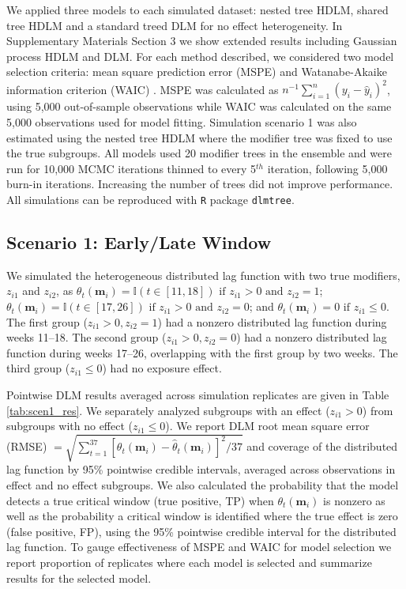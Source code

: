 \documentclass[12pt]{article}
\begin{document}
We applied three models to each simulated dataset: nested tree HDLM, shared tree HDLM and a standard treed DLM for no effect heterogeneity. In Supplementary Materials Section 3 we show extended results including Gaussian process HDLM and DLM. For each method described, we considered two model selection criteria: mean square prediction error (MSPE) and Watanabe-Akaike information criterion (WAIC) \citep{Watanabe2010AsymptoticTheory}. MSPE was calculated as $n^{-1}\sum_{i=1}^n(y_i-\hat{y}_i)^2$, using 5,000 out-of-sample observations while WAIC was calculated on the same 5,000 observations used for model fitting. Simulation scenario 1 was also estimated using the nested tree HDLM where the modifier tree was fixed to use the true subgroups. All models used 20 modifier trees in the ensemble and were run for 10,000 MCMC iterations thinned to every 5$^{th}$ iteration, following 5,000 burn-in iterations. Increasing the number of trees did not improve performance. All simulations can be reproduced with \texttt{R} package \texttt{dlmtree}.

\subsection{Scenario 1: Early/Late Window}

We simulated the heterogeneous distributed lag function with two true modifiers,  $z_{i1}$ and $z_{i2}$, as $\theta_t(\mathbf{m}_i)= \mathbb{I}(t\in[11,18])\text{ if }z_{i1}>0\text{ and }z_{i2}=1$; $\theta_t(\mathbf{m}_i)= \mathbb{I}(t\in[17,26])\text{ if }z_{i1}>0\text{ and }z_{i2}= 0$; and $\theta_t(\mathbf{m}_i)= 0\text{ if } z_{i1}\leq 0$.
The first group ($z_{i1}>0, z_{i2}=1$) had a nonzero distributed lag function during weeks 11--18. The second group ($z_{i1}>0, z_{i2}=0$) had a nonzero distributed lag function during weeks 17--26, overlapping with the first group by two weeks. The third group ($z_{i1}\leq 0$) had no exposure effect.

Pointwise DLM results averaged across simulation replicates are given in Table \ref{tab:scen1_res}. We separately analyzed subgroups with an effect ($z_{i1}>0$) from subgroups with no effect ($z_{i1}\leq0$). We report DLM root mean square error (RMSE) $=\sqrt{\sum_{t=1}^{37}[\theta_t(\mathbf{m}_i)-\hat{\theta}_t(\mathbf{m}_i)]^2/37}$ and coverage of the distributed lag function by 95\% pointwise credible intervals, averaged across observations in effect and no effect subgroups. We also calculated the probability that the model detects a true critical window (true positive, TP) when $\theta_t(\mathbf{m}_i)$ is nonzero as well as the probability a critical window is identified where the true effect is zero (false positive, FP), using the 95\% pointwise credible interval for the distributed lag function. To gauge effectiveness of MSPE and WAIC for model selection we report proportion of replicates where each model is selected and summarize results for the selected model.
\end{document}
